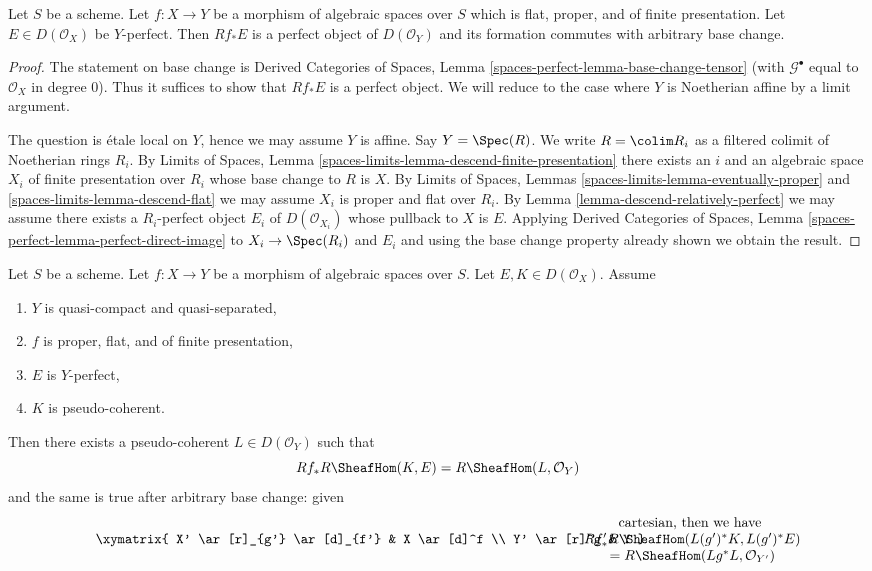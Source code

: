 \begin{lemma}
\label{lemma-derived-pushforward-rel-perfect}
Let $S$ be a scheme.
Let $f : X \to Y$ be a morphism of algebraic spaces over $S$
which is flat, proper, and
of finite presentation. Let $E \in D(\mathcal{O}_X)$ be $Y$-perfect.
Then $Rf_*E$ is a perfect object of $D(\mathcal{O}_Y)$
and its formation commutes with arbitrary base change.
\end{lemma}

\begin{proof}
The statement on base change is Derived Categories of Spaces,
Lemma \ref{spaces-perfect-lemma-base-change-tensor} (with
$\mathcal{G}^\bullet$ equal to $\mathcal{O}_X$ in degree $0$).
Thus it suffices to show that $Rf_*E$ is a perfect object. We will reduce
to the case where $Y$ is Noetherian affine by a limit argument.

\medskip\noindent
The question is \'etale local on $Y$, hence we may assume $Y$ is affine.
Say $Y = \Spec(R)$. We write $R = \colim R_i$ as a filtered colimit
of Noetherian rings $R_i$. By Limits of Spaces, Lemma
\ref{spaces-limits-lemma-descend-finite-presentation}
there exists an $i$ and an algebraic space
$X_i$ of finite presentation over $R_i$
whose base change to $R$ is $X$. By
Limits of Spaces, Lemmas \ref{spaces-limits-lemma-eventually-proper} and
\ref{spaces-limits-lemma-descend-flat}
we may assume $X_i$ is proper and flat over $R_i$.
By Lemma \ref{lemma-descend-relatively-perfect}
we may assume there exists a $R_i$-perfect object $E_i$ of
$D(\mathcal{O}_{X_i})$ whose pullback to $X$ is $E$.
Applying Derived Categories of Spaces,
Lemma \ref{spaces-perfect-lemma-perfect-direct-image}
to $X_i \to \Spec(R_i)$ and $E_i$ and using the
base change property already shown we obtain the result.
\end{proof}

\begin{lemma}
\label{lemma-compute-ext-rel-perfect}
Let $S$ be a scheme.
Let $f : X \to Y$ be a morphism of algebraic spaces over $S$.
Let $E, K \in D(\mathcal{O}_X)$.
Assume
\begin{enumerate}
\item $Y$ is quasi-compact and quasi-separated,
\item $f$ is proper, flat, and of finite presentation,
\item $E$ is $Y$-perfect,
\item $K$ is pseudo-coherent.
\end{enumerate}
Then there exists a pseudo-coherent $L \in D(\mathcal{O}_Y)$ such that
$$
Rf_*R\SheafHom(K, E) = R\SheafHom(L, \mathcal{O}_Y)
$$
and the same is true after arbitrary base change: given
$$
\vcenter{
\xymatrix{
X' \ar[r]_{g'} \ar[d]_{f'} &
X \ar[d]^f \\
Y' \ar[r]^g &
Y
}
}
\quad\quad
\begin{matrix}
\text{cartesian, then we have } \\
Rf'_*R\SheafHom(L(g')^*K, L(g')^*E) \\
= R\SheafHom(Lg^*L, \mathcal{O}_{Y'})
\end{matrix}
$$
\end{lemma}

